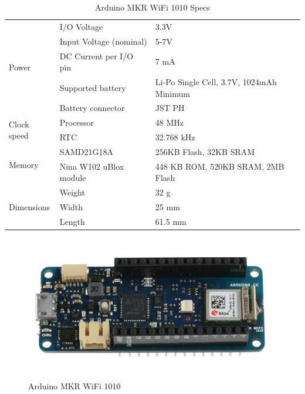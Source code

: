 \begin{table}[H]
\begin{tabular}{|l|l|l|}
        
        \multirow{5}{*}{Power}  & I/O Voltage & 3.3V \\\cline{2-3}
                                & Input Voltage (nominal) & 5-7V \\\cline{2-3}
                                & DC Current per I/O pin & 7 mA \\\cline{2-3}
                                & Supported battery & Li-Po Single  Cell, 3.7V, 1024mAh Minimum \\\cline{2-3}
                                & Battery connector & JST PH \\\hline
                                
        \multirow{2}{*}{Clock speed}    & Processor & 48 MHz \\\cline{2-3}
                                        & RTC & 32.768 kHz \\\hline
                    
        \multirow{2}{*}{Memory} & SAMD21G18A & 256KB Flash, 32KB SRAM \\\cline{2-3}
                                & Nina W102 uBlox module & 448 KB ROM, 520KB SRAM, 2MB Flash \\\hline
                                
        \multirow{3}{*}{Dimensions} & Weight & 32 g \\\cline{2-3}
                                    & Width	& 25 mm \\\cline{2-3}
                                    & Length & 61.5 mm \\\hline
    \end{tabular}
    \caption{Arduino MKR WiFi 1010 Specs}
\end{table}

\begin{figure}[H]
    \hfill
    \begin{minipage}{.45\textwidth}
        
    \end{minipage}
    \hfill
    \begin{minipage}{.45\textwidth}
        \includegraphics[width=\textwidth]{images/components/arduino_mkr.png}
    \end{minipage}
    \hfill
    \caption{Arduino MKR WiFi 1010}
\end{figure}


